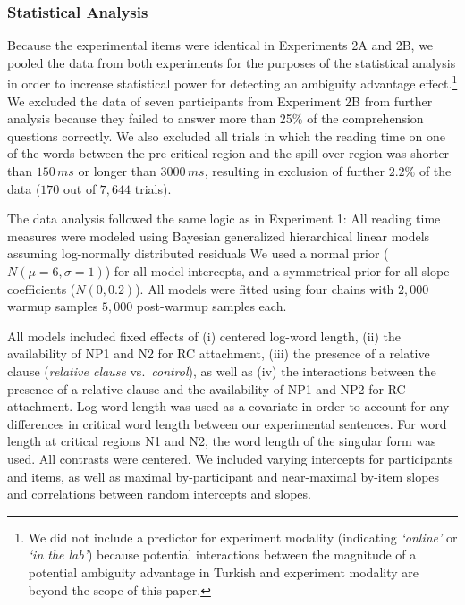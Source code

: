 \documentclass[english, doc]{apa7}\usepackage[]{graphicx}\usepackage[]{color}
\def \red  { }
\begin{document}
\subsubsection{Statistical Analysis}

{\red
Because the experimental items were identical in Experiments 2A and 2B, we pooled the data from both experiments for the purposes of the statistical analysis in order to increase statistical power for detecting an ambiguity advantage effect.\footnote{We did not include a predictor for experiment modality (indicating \textit{`online'} or \textit{`in the lab'}) because potential interactions between the magnitude of a potential ambiguity advantage in Turkish and experiment modality are beyond the scope of this paper.} }  
%
We excluded the data of seven participants from Experiment 2B from further analysis because they failed to answer more than 25\% of the comprehension questions correctly. 
We also excluded all trials in which the reading time on one of the words between the pre-critical region and the spill-over region was shorter than $150\,ms$ or longer than $3000\,ms$, resulting in exclusion of further $2.2\%$ of the data ($170$ out of $7,644$ trials).

The data analysis followed the same logic as in Experiment 1:
All reading time measures were modeled using Bayesian generalized hierarchical linear models assuming log-normally distributed residuals 
We used a normal prior ($N(\mu=6, \sigma=1)$) for all model intercepts, and a symmetrical prior for all slope coefficients ($N(0, 0.2)$). All models were fitted using four chains with \(2,000\) warmup samples  \(5,000\) post-warmup samples each.


All models included fixed effects of 
(i) centered log-word length, 
(ii) the availability of NP1 and N2 for RC attachment, 
(iii) the presence of a relative clause (\emph{relative clause} vs.~\emph{control}), as well as 
(iv) the interactions between the presence of a relative clause and the availability of NP1 and NP2 for RC attachment.
Log word length was used as a covariate in order to account for any differences in critical word length between our experimental sentences. For word length at critical regions N1 and N2, the word length of the singular form was used. All contrasts were centered.
%
We included varying intercepts for participants and items, as well as maximal by-participant and near-maximal by-item slopes and correlations between random intercepts and slopes. 
\end{document}
